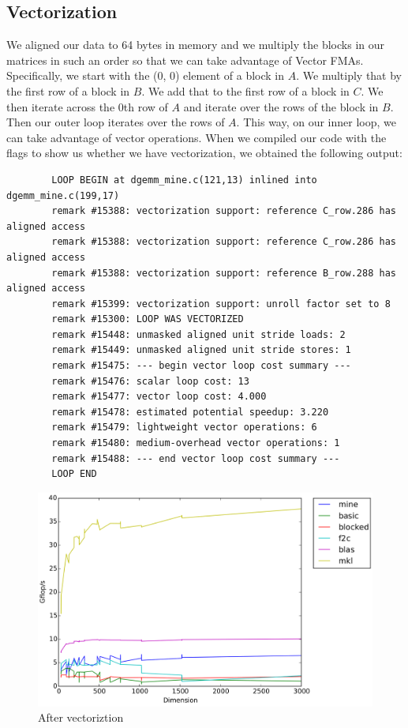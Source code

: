 \documentclass[11pt]{article}
\begin{document}
        
                
        \subsection{Vectorization}
        We aligned our data to 64 bytes in memory and we multiply the blocks in our matrices in such an order so that we can take advantage of Vector FMAs. Specifically, we start with the (0, 0) element of a block in $A$. We multiply that by the first row of a block in $B$. We add that to the first row of a block in $C$. We then iterate across the 0th row of $A$ and iterate over the rows of the block in $B$. Then our outer loop iterates over the rows of $A$. This way, on our inner loop, we can take advantage of vector operations. When we compiled our code with the flags to show us whether we have vectorization, we obtained the following output:
        
        \vspace{1cm}
        
        \begin{lstlisting}
        LOOP BEGIN at dgemm_mine.c(121,13) inlined into dgemm_mine.c(199,17)
        remark #15388: vectorization support: reference C_row.286 has aligned access
        remark #15388: vectorization support: reference C_row.286 has aligned access
        remark #15388: vectorization support: reference B_row.288 has aligned access
        remark #15399: vectorization support: unroll factor set to 8
        remark #15300: LOOP WAS VECTORIZED
        remark #15448: unmasked aligned unit stride loads: 2 
        remark #15449: unmasked aligned unit stride stores: 1 
        remark #15475: --- begin vector loop cost summary ---
        remark #15476: scalar loop cost: 13 
        remark #15477: vector loop cost: 4.000 
        remark #15478: estimated potential speedup: 3.220 
        remark #15479: lightweight vector operations: 6 
        remark #15480: medium-overhead vector operations: 1 
        remark #15488: --- end vector loop cost summary ---
        LOOP END
        \end{lstlisting}
        
        \vspace{0.5cm}

        \begin{figure}[H]
            \centering
            \includegraphics[width=4.5in]{timing_vector_32_cp_align.png}
            \caption{After vectoriztion}
        \end{figure}
        
\end{document}
